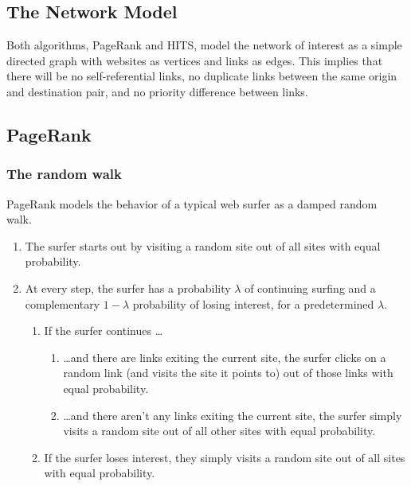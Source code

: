 \documentclass[12pt, titlepage, twoside]{amsart}
\begin{document}
\subsection{The Network Model}

Both algorithms, PageRank and HITS, model the network of interest as a simple directed graph with websites as vertices
and links as edges.
This implies that there will be no self-referential links, no duplicate links between the same origin
and destination pair, and no priority difference between links.

\subsection{PageRank}

\subsubsection{The random walk}

PageRank models the behavior of a typical web surfer as a damped random walk.~\cite{pagerank}

\begin{enumerate}
  \item The surfer starts out by visiting a random site out of all sites with equal probability.
  \item At every step, the surfer has a probability $\lambda$ of continuing surfing and a complementary
    $1 - \lambda$ probability of losing interest, for a predetermined $\lambda$.
  
    \begin{enumerate}
      \item If the surfer continues \ldots

        \begin{enumerate}
          \item \ldots and there are links exiting the current site, the surfer
            clicks on a random link (and visits the site it points to) out of those links with equal probability.
          \item \ldots and there aren't any links exiting the current site, the surfer simply
            visits a random site out of all other sites with equal probability.
        \end{enumerate}

      \item If the surfer loses interest, they simply visits a random site out of all sites with equal probability.
    \end{enumerate}

\end{enumerate}
\end{document}
